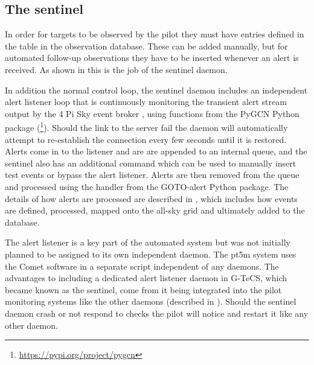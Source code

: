 
\subsection{The sentinel}
\label{sec:sentinel}
\begin{colsection}

In order for targets to be observed by the pilot they must have entries defined in the  table in the observation database. These can be added manually, but for automated follow-up observations they have to be inserted whenever an alert is received. As shown in  this is the job of the sentinel daemon.

In addition the normal control loop, the sentinel daemon includes an independent alert listener loop that is continuously monitoring the transient alert stream output by the 4 Pi Sky event broker \citep{4pisky}, using functions from the PyGCN Python package (\footnote{\url{https://pypi.org/project/pygcn}}). Should the link to the server fail the daemon will automatically attempt to re-establish the connection every few seconds until it is restored. Alerts come in to the listener and are are appended to an internal queue, and the sentinel also has an additional  command which can be used to manually insert test events or bypass the alert listener. Alerts are then removed from the queue and processed using the handler from the GOTO-alert Python package. The details of how alerts are processed are described in , which includes how events are defined, processed, mapped onto the all-sky grid and ultimately added to the database.

The alert listener is a key part of the automated system but was not initially planned to be assigned to its own independent daemon. The pt5m system uses the Comet software \citep{comet} in a separate script independent of any daemons. The advantages to including a dedicated alert listener daemon in G-TeCS, which became known as the sentinel, come from it being integrated into the pilot monitoring systems like the other daemons (described in ). Should the sentinel daemon crash or not respond to checks the pilot will notice and restart it like any other daemon.

\end{colsection}


